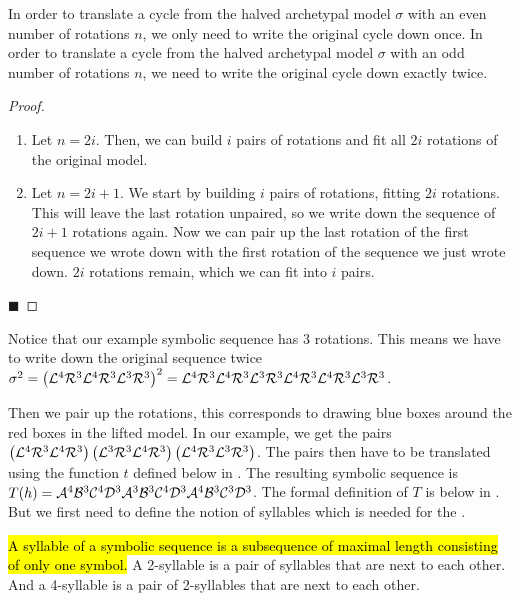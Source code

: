 \begin{lemma}
	\label{lemma:writing.down}
	In order to translate a cycle from the halved archetypal model $\sigma$ with an even number of rotations $n$, we only need to write the original cycle down once.
	In order to translate a cycle from the halved archetypal model $\sigma$ with an odd number of rotations $n$, we need to write the original cycle down exactly twice.
\end{lemma}

\begin{proof} \phantom{x}
	\begin{enumerate}
		\item Let $n = 2i$. Then, we can build $i$ pairs of rotations and fit all $2i$ rotations of the original model.
		\item Let $n = 2i + 1$. We start by building $i$ pairs of rotations, fitting $2i$ rotations.
		      This will leave the last rotation unpaired, so we write down the sequence of $2i + 1$ rotations again.
		      Now we can pair up the last rotation of the first sequence we wrote down with the first rotation of the sequence we just wrote down.
		      $2i$ rotations remain, which we can fit into $i$ pairs.
	\end{enumerate}
	\hfill $\blacksquare$
\end{proof}

Notice that our example symbolic sequence has 3 rotations.
This means we have to write down the original sequence twice
$\sigma^2 = \left(\mathcal{L}^4\mathcal{R}^3\mathcal{L}^4\mathcal{R}^3\mathcal{L}^3\mathcal{R}^3\right)^2 = \mathcal{L}^4\mathcal{R}^3\mathcal{L}^4\mathcal{R}^3\mathcal{L}^3\mathcal{R}^3\mathcal{L}^4\mathcal{R}^3\mathcal{L}^4\mathcal{R}^3\mathcal{L}^3\mathcal{R}^3$.

Then we pair up the rotations, this corresponds to drawing blue boxes around the red boxes in the lifted model.
In our example, we get the pairs $\left(\mathcal{L}^4\mathcal{R}^3\mathcal{L}^4\mathcal{R}^3\right)\left(\mathcal{L}^3\mathcal{R}^3\mathcal{L}^4\mathcal{R}^3\right)\left(\mathcal{L}^4\mathcal{R}^3\mathcal{L}^3\mathcal{R}^3\right)$.
The pairs then have to be translated using the function $t$ defined below in .
The resulting symbolic sequence is $T(h) = \mathcal{A}^4\mathcal{B}^3\mathcal{C}^4\mathcal{D}^3\mathcal{A}^3\mathcal{B}^3\mathcal{C}^4\mathcal{D}^3\mathcal{A}^4\mathcal{B}^3\mathcal{C}^3\mathcal{D}^3$.
The formal definition of $T$ is below in .
But we first need to define the notion of syllables which is needed for the .

\begin{definition}[Syllables]
	\hl{
		A syllable of a symbolic sequence is a subsequence of maximal length consisting of only one symbol.
	}
	A 2-syllable is a pair of syllables that are next to each other.
	And a 4-syllable is a pair of 2-syllables that are next to each other.
\end{definition}

